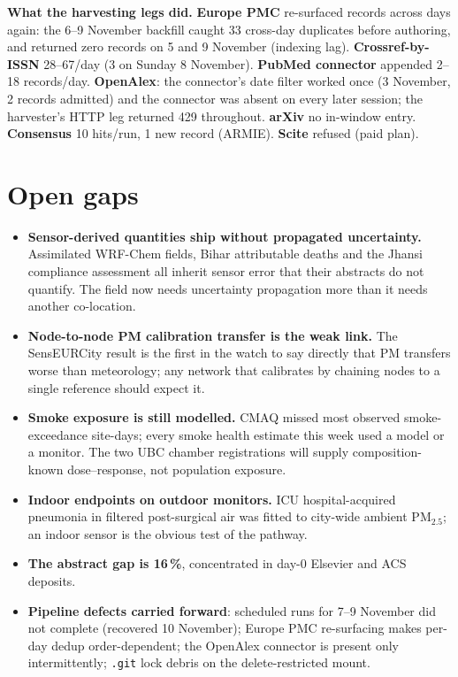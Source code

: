 \documentclass[10pt]{article}
\begin{document}
\vspace{1.5mm}
\textbf{What the harvesting legs did.} \textbf{Europe PMC} re-surfaced records across days again: the 6--9 November
backfill caught 33 cross-day duplicates before authoring, and returned zero records on 5 and 9 November (indexing
lag). \textbf{Crossref-by-ISSN} 28--67/day (3 on Sunday 8 November). \textbf{PubMed connector} appended 2--18
records/day. \textbf{OpenAlex}: the connector's date filter worked once (3 November, 2 records admitted) and the
connector was absent on every later session; the harvester's HTTP leg returned 429 throughout. \textbf{arXiv} no
in-window entry. \textbf{Consensus} 10 hits/run, 1 new record (ARMIE). \textbf{Scite} refused (paid plan).

\vspace{2mm}
\section*{\sffamily\bfseries\color{Deep}Open gaps}
\vspace{-1.5mm}{\color{Teal}\rule{\linewidth}{1.1pt}}\vspace{2.5mm}

\footnotesize
\begin{itemize}
\item \textbf{Sensor-derived quantities ship without propagated uncertainty.} Assimilated WRF-Chem fields, Bihar
attributable deaths and the Jhansi compliance assessment all inherit sensor error that their abstracts do not
quantify. The field now needs uncertainty propagation more than it needs another co-location.

\item \textbf{Node-to-node PM calibration transfer is the weak link.} The SensEURCity result is the first in the
watch to say directly that PM transfers worse than meteorology; any network that calibrates by chaining nodes to a
single reference should expect it.

\item \textbf{Smoke exposure is still modelled.} CMAQ missed most observed smoke-exceedance site-days; every smoke
health estimate this week used a model or a monitor. The two UBC chamber registrations will supply composition-known
dose--response, not population exposure.

\item \textbf{Indoor endpoints on outdoor monitors.} ICU hospital-acquired pneumonia in filtered post-surgical air was
fitted to city-wide ambient PM$_{2.5}$; an indoor sensor is the obvious test of the pathway.

\item \textbf{The abstract gap is 16\,\%}, concentrated in day-0 Elsevier and ACS deposits.

\item \textbf{Pipeline defects carried forward}: scheduled runs for 7--9 November did not complete (recovered
10 November); Europe PMC re-surfacing makes per-day dedup order-dependent; the OpenAlex connector is present only
intermittently; \texttt{.git} lock debris on the delete-restricted mount.
\end{itemize}
\end{document}
